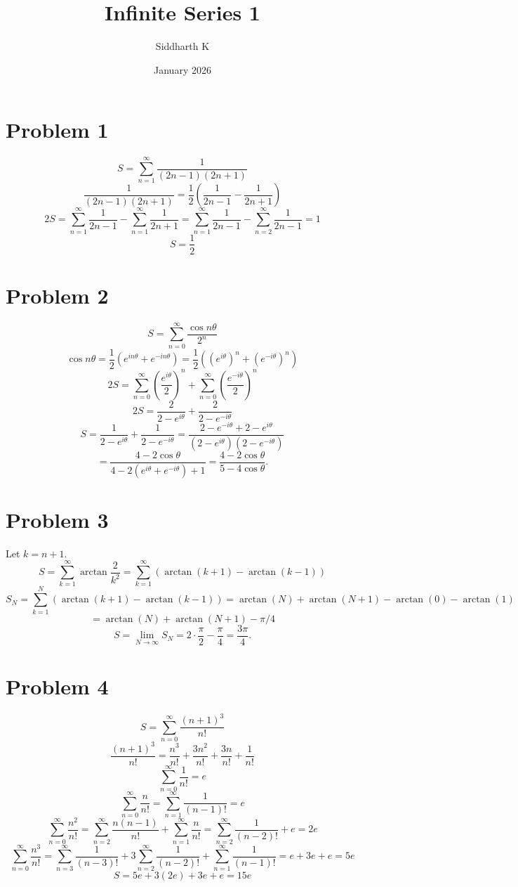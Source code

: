 \documentclass{article}
\title{Infinite Series 1}
\author{Siddharth K}
\date{January 2026}
\newcommand{\bigp}[1]{\left(#1\right)}
\newcommand{\summation}[1][0]{\sum_{n=#1}^\infty}
\newcommand{\summationk}[1][0]{\sum_{k=#1}^\infty}
\begin{document}
\maketitle

\section*{Problem 1}
$$S = \summation[1] \frac{1}{(2n - 1)(2n + 1)}$$
$$\frac{1}{(2n - 1)(2n + 1)} = \frac{1}{2}\bigp{\frac{1}{2n - 1} - \frac{1}{2n + 1}}$$
$$2S = \summation[1] \frac{1}{2n - 1} - \summation[1] \frac{1}{2n + 1} = \summation[1] \frac{1}{2n - 1} - \summation[2] \frac{1}{2n - 1} = 1$$
$$S = \frac{1}{2}$$

\section*{Problem 2}
$$S = \summation \frac{\cos n\theta}{2^n}$$
$$\cos n\theta = \frac{1}{2}(e^{in\theta} + e^{-in\theta}) = \frac{1}{2}((e^{i\theta})^n + (e^{-i\theta})^n)$$
$$2S = \summation \bigp{\frac{e^{i\theta}}{2}}^n + \summation \bigp{\frac{e^{-i\theta}}{2}}^n$$
$$2S = \frac{2}{2 - e^{i\theta}} + \frac{2}{2 - e^{-i\theta}}$$
$$S = \frac{1}{2 - e^{i\theta}} + \frac{1}{2 - e^{-i\theta}} = \frac{2 - e^{-i\theta} + 2 - e^{i\theta}}{(2 - e^{i\theta})(2 - e^{-i\theta})}$$
$$= \frac{4 - 2\cos\theta}{4 - 2(e^{i\theta} + e^{-i\theta}) + 1} = \frac{4 - 2\cos\theta}{5 - 4\cos\theta}.$$

\section*{Problem 3}
Let $k = n + 1$.
$$S = \summationk[1] \arctan\frac{2}{k^2} = \summationk[1] (\arctan(k + 1) - \arctan(k - 1))$$
$$S_N = \sum_{k = 1}^N (\arctan(k + 1) - \arctan(k - 1)) = \arctan(N) + \arctan(N + 1) - \arctan(0) - \arctan(1)$$
$$= \arctan(N) + \arctan(N + 1) - \pi/4$$
$$S = \lim_{N \to \infty} S_N = 2 \cdot \frac{\pi}{2} - \frac{\pi}{4} = \frac{3\pi}{4}.$$

\section*{Problem 4}
$$S = \summation \frac{(n + 1)^3}{n!}$$
$$\frac{(n + 1)^3}{n!} = \frac{n^3}{n!} + \frac{3n^2}{n!} + \frac{3n}{n!} + \frac{1}{n!}$$
$$\summation \frac{1}{n!} = e$$
$$\summation \frac{n}{n!} = \summation[1] \frac{1}{(n - 1)!} = e$$
$$\summation \frac{n^2}{n!} = \summation[2] \frac{n(n - 1)}{n!} + \summation[1] \frac{n}{n!} = \summation[2] \frac{1}{(n- 2)!} + e = 2e$$
$$\summation \frac{n^3}{n!} = \summation[3] \frac{1}{(n - 3)!} + 3\summation[2] \frac{1}{(n - 2)!} + \summation[1] \frac{1}{(n - 1)!} = e + 3e + e = 5e$$
$$S = 5e + 3(2e) + 3e + e = 15e$$
\end{document}
